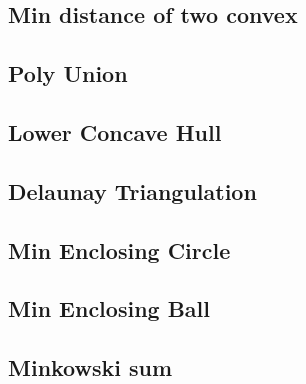 \documentclass[a4paper,10pt,twocolumn,oneside]{article}
\begin{document}
\subsection{Min distance of two convex}


%

\subsection{Poly Union}


\subsection{Lower Concave Hull}


\subsection{Delaunay Triangulation}


\subsection{Min Enclosing Circle}


\subsection{Min Enclosing Ball}


%

\subsection{Minkowski sum}


% 
\end{document}

